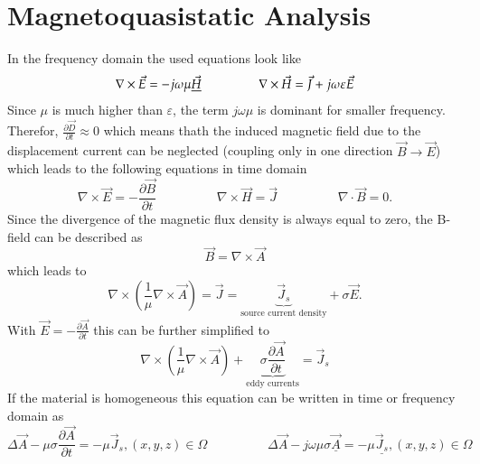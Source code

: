 \section{Magnetoquasistatic Analysis}
In the frequency domain the used equations look like 
\begin{equation*}
	\nabla \times \vec{E} = -j\omega\mu\underline{\vec{H}}
	\hspace{1.6cm}
	\nabla \times \vec{H} = \vec{J} + j\omega \varepsilon \vec{E}
\end{equation*}
Since $\mu$ is much higher than $\varepsilon$, the term $j\omega\mu$ is dominant for smaller frequency. Therefor, $\frac{\partial \vec{D}}{\partial t} \approx 0$ which means thath the induced magnetic field due to the displacement current can be neglected (coupling only in one direction $\vec{B} \rightarrow \vec{E}$) which leads to the following equations in time domain
\begin{equation*}
	\nabla \times \vec{E} = -\frac{\partial \vec{B}}{\partial t}
	\hspace{2cm}
	\nabla \times \vec{H} = \vec{J}
	\hspace{2cm}
	\nabla \cdot \vec{B} = 0.
\end{equation*}
Since the divergence of the magnetic flux density is always equal to zero, the B-field can be described as
\begin{equation*}
	\vec{B} = \nabla \times \vec{A}
\end{equation*}
which leads to 
\begin{equation*}
	\nabla \times \left(\frac{1}{\mu} \nabla \times \vec{A}\right) = \vec{J} = \underbrace{\vec{J}_s}_{\textrm{source current density}} + \sigma \vec{E}.
\end{equation*}
With $\vec{E} = - \frac{\partial \vec{A}}{\partial t}$ this can be further simplified to
\begin{equation*}
	\nabla \times \left(\frac{1}{\mu}\nabla \times \vec{A}\right) + \underbrace{\sigma \frac{\partial \vec{A}}{\partial t}}_{\textrm{eddy currents}} = \vec{J}_s
\end{equation*}
If the material is homogeneous this equation can be written in time or frequency domain as 
\begin{equation*}
	\Delta\vec{A} -\mu\sigma\frac{\partial \vec{A}}{\partial t} = -\mu \vec{J}_s, (x,y,z)\in \Omega
	\hspace{2cm}
	\Delta\vec{A} - j\omega\mu\sigma\underline{\vec{A}} = -\mu\underline{\vec{J}_s}, (x,y,z)\in \Omega
\end{equation*}

